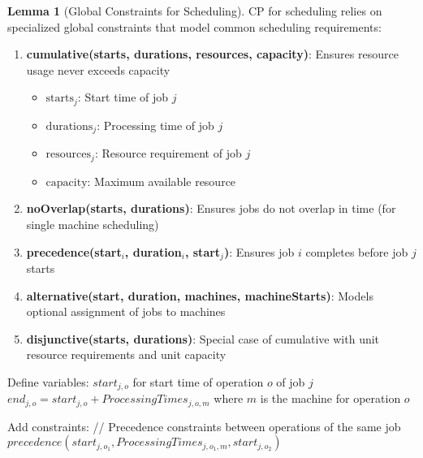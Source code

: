 \documentclass{article}
\theoremstyle{definition}
\newtheorem{lemma}{Lemma}
\begin{document}
\begin{lemma}[Global Constraints for Scheduling]
CP for scheduling relies on specialized global constraints that model common scheduling requirements:

\begin{enumerate}
    \item \textbf{cumulative(starts, durations, resources, capacity)}: Ensures resource usage never exceeds capacity
    \begin{itemize}
        \item $\text{starts}_j$: Start time of job $j$
        \item $\text{durations}_j$: Processing time of job $j$
        \item $\text{resources}_j$: Resource requirement of job $j$
        \item $\text{capacity}$: Maximum available resource
    \end{itemize}
    
    \item \textbf{noOverlap(starts, durations)}: Ensures jobs do not overlap in time (for single machine scheduling)
    
    \item \textbf{precedence(start$_i$, duration$_i$, start$_j$)}: Ensures job $i$ completes before job $j$ starts
    
    \item \textbf{alternative(start, duration, machines, machineStarts)}: Models optional assignment of jobs to machines
    
    \item \textbf{disjunctive(starts, durations)}: Special case of cumulative with unit resource requirements and unit capacity
\end{enumerate}

\begin{algorithm}
\caption{CP Model for Job Shop Scheduling}
\begin{algorithmic}[1]
    \State Define variables:
    \State \quad $start_{j,o}$ for start time of operation $o$ of job $j$
    \State \quad $end_{j,o} = start_{j,o} + ProcessingTimes_{j,o,m}$ where $m$ is the machine for operation $o$
    
    \State Add constraints:
    \State \quad // Precedence constraints between operations of the same job
        \State $precedence(start_{j,o_1}, ProcessingTimes_{j,o_1,m}, start_{j,o_2})$
    \EndFor
    

\end{algorithmic}
\end{algorithm}
\end{lemma}
\end{document}
